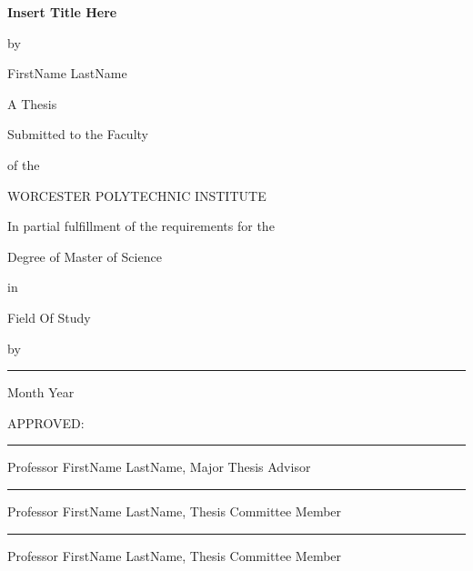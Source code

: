 \begin{titlepage}
\newcommand{\brk}{\vspace*{0.18in}}

\thispagestyle{empty}


\begin{center}

\brk

   {\large 
	\textbf{
	Insert Title Here
	}
   }


\brk
by

\brk
FirstName LastName

\brk
A Thesis

\brk
Submitted to the Faculty

\brk
of the

\brk
WORCESTER POLYTECHNIC INSTITUTE

\brk
In partial fulfillment of the requirements for the

\brk
Degree of Master of Science

\brk
in

\brk
Field Of Study

\brk
by

\brk\brk
\rule{3in}{1.2pt}

\brk
Month Year
\end{center}
APPROVED:

\vspace{0.25in}
\rule{3in}{0.8pt}

Professor FirstName LastName, Major Thesis Advisor

\vspace{0.25in}
\rule{3in}{0.8pt}

Professor FirstName LastName, Thesis Committee Member	

\vspace{0.25in}
\rule{3in}{0.8pt}

Professor FirstName LastName, Thesis Committee Member
\end{titlepage}
